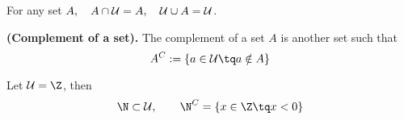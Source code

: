 \begin{remark}
    For any set $A,\quad A\cap\mathcal{U} = A,\quad\mathcal{U}\cup A = \mathcal{U}$.
\end{remark}
\begin{definition}
    \textbf{(Complement of a set).} The complement of a set $A$ is another set such that
    \begin{equation}
        A^C:=\{a\in\uset\tq a\notin A\}
    \end{equation}
\end{definition}
\begin{example}
    Let $\uset = \Z$, then
    \begin{equation}
        \N\subset\uset, \quad\quad\N^C = \{x\in\Z\tq x<0\}
    \end{equation}
\end{example}

